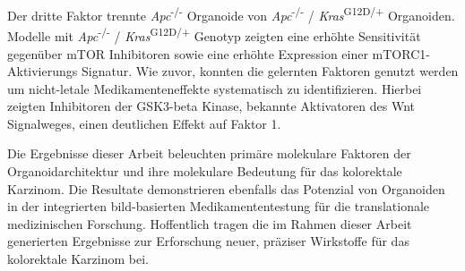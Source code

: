 Der dritte Faktor trennte \textit{Apc}\textsuperscript{-/-} Organoide von \textit{Apc}\textsuperscript{-/-} / \textit{Kras}\textsuperscript{G12D/+} Organoiden. Modelle mit  \textit{Apc}\textsuperscript{-/-} / \textit{Kras}\textsuperscript{G12D/+} Genotyp zeigten eine erhöhte Sensitivität gegenüber mTOR Inhibitoren sowie eine erhöhte Expression einer mTORC1-Aktivierungs Signatur.
Wie zuvor, konnten die gelernten Faktoren genutzt werden um nicht-letale Medikamenteneffekte systematisch zu identifizieren. Hierbei zeigten Inhibitoren der GSK3-beta Kinase, bekannte Aktivatoren des Wnt Signalweges, einen deutlichen Effekt auf Faktor 1.
\bigbreak

Die Ergebnisse dieser Arbeit beleuchten primäre molekulare Faktoren der Organoidarchitektur und ihre molekulare Bedeutung für das kolorektale Karzinom. Die Resultate demonstrieren ebenfalls das Potenzial von Organoiden in der integrierten bild-basierten Medikamententestung für die translationale medizinischen Forschung. Hoffentlich tragen die im Rahmen dieser Arbeit generierten Ergebnisse zur Erforschung neuer, präziser Wirkstoffe für das kolorektale Karzinom bei.